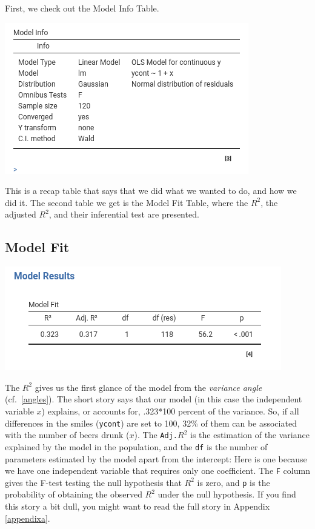 \documentclass[
]{book}
\begin{document}
First, we check out the {Model Info} Table.

\includegraphics[width=0.9\linewidth]{bookletpics/2_output1}

This is a recap table that says that we did what we wanted to do, and how we did it. The second table we get is the {Model Fit} Table, where the \(R^2\), the adjusted \(R^2\), and their inferential test are presented.

\hypertarget{twofit}{%
\subsection{Model Fit}\label{twofit}}

\includegraphics[width=0.9\linewidth]{bookletpics/2_output2}

The \(R^2\) gives us the first glance of the model from the \emph{variance angle} (cf.~\ref{angles}). The short story says that our model (in this case the independent variable \(x\)) explains, or accounts for, .323*100 percent of the variance. So, if all differences in the smiles (\texttt{ycont}) are set to 100, 32\% of them can be associated with the number of beers drunk (\(x\)). The \texttt{Adj.}\(R^2\) is the estimation of the variance explained by the model in the population, and the \texttt{df} is the number of parameters estimated by the model apart from the intercept: Here is one because we have one independent variable that requires only one coefficient. The \texttt{F} column gives the F-test testing the null hypothesis that \(R^2\) is zero, and \texttt{p} is the probability of obtaining the observed \(R^2\) under the null hypothesis. If you find this story a bit dull, you might want to read the full story in Appendix \ref{appendixa}.
\end{document}
